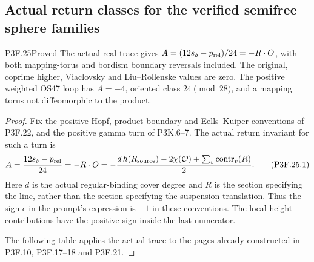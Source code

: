 \subsection{Actual return classes for the verified semifree sphere families}
\begin{statement}{P3F.25}{Proved}
The actual real trace gives $A=(12s_\delta-p_{\rm rel})/24=-R\cdot O$, with both mapping-torus and bordism boundary reversals included. The original, coprime higher, Viaclovsky and Liu--Rollenske values are zero. The positive weighted OS47 loop has $A=-4$, oriented class $24\pmod{28}$, and a mapping torus not diffeomorphic to the product.
\end{statement}
\begin{proof}
Fix the positive Hopf, product-boundary and Eells--Kuiper conventions of P3F.22, and the positive gamma turn of P3K.6--7. The actual return invariant for such a turn is \[
 A=\frac{12s_\delta-p_{\rm rel}}{24}
   =-R\cdot O
   =-\frac{d\,h(R_{\rm source})-2\chi(\mathcal O)
                  +\sum_v\operatorname{contr}_v(R)}2. \tag{P3F.25.1}
\] Here \(d\) is the actual regular-binding cover degree and \(R\) is the section specifying the line, rather than the section specifying the suspension translation. Thus the sign \(\epsilon\) in the prompt's expression is \(-1\) in these conventions. The local height contributions have the positive sign inside the last numerator.

The following table applies the actual trace to the pages already constructed in P3F.10, P3F.17--18 and P3F.21.


\end{proof}
